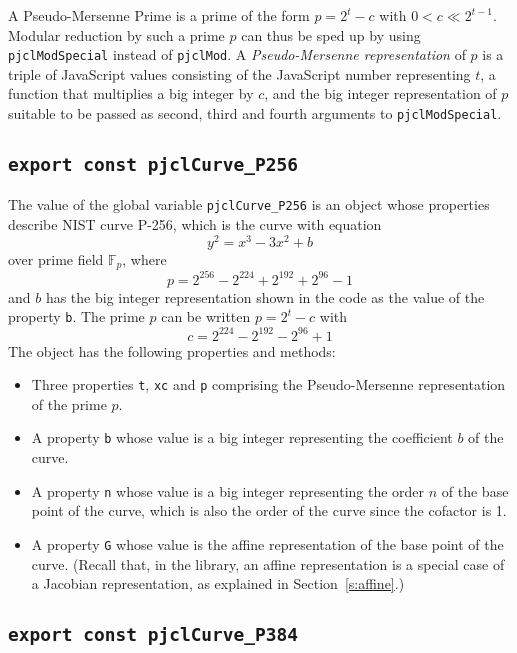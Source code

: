 \documentclass[12pt]{article}
\begin{document}
A Pseudo-Mersenne Prime is a prime of the form $p=2^t-c$ with 
$0 < c \ll 2^{t-1}$.  Modular reduction by such a prime $p$ can thus be sped up
by using {\tt pjclModSpecial} instead of {\tt pjclMod}.
A {\em Pseudo-Mersenne representation\/} of $p$ is
a triple of JavaScript values consisting of the JavaScript number
representing $t$, a function that multiplies a big integer by $c$, and
the big integer representation of $p$ suitable to be passed as second, third and fourth arguments to 
{\tt pjclModSpecial}.

\subsection{\tt export const pjclCurve\_P256}

The value of the global variable {\tt pjclCurve\_P256} is an 
object whose properties describe NIST
curve P-256, which is the curve with equation
$$
y^2 = x^3 - 3x^2 + b
$$
over prime field $\mathbb{F}_p$, where
$$
p = 2^{256} - 2^{224} + 2^{192} + 2^{96} - 1
$$
and $b$ has the big integer representation shown in the code as the
value of the property {\tt b}.  The prime $p$ can be written $p=2^t-c$
with
$$
c = 2^{224} - 2^{192} - 2^{96} + 1
$$
The object has the following properties and methods:
\begin{itemize}

\item Three properties {\tt t}, {\tt xc} and {\tt p} comprising the
  Pseudo-Mersenne representation of the prime $p$.

\item A property {\tt b} whose value is a big integer representing the
  coefficient $b$ of the curve.

\item A property {\tt n} whose value is a big integer representing
  the order $n$ of the base point of the curve, which is also the order of the curve since the cofactor is 1.

\item A property {\tt G} whose value is the affine representation of
  the base point of the curve.  (Recall that, in the library, an affine representation
  is a special case of a Jacobian representation, as explained in Section~\ref{s:affine}.)

\end{itemize}

\subsection{\tt export const pjclCurve\_P384}
\end{document}
